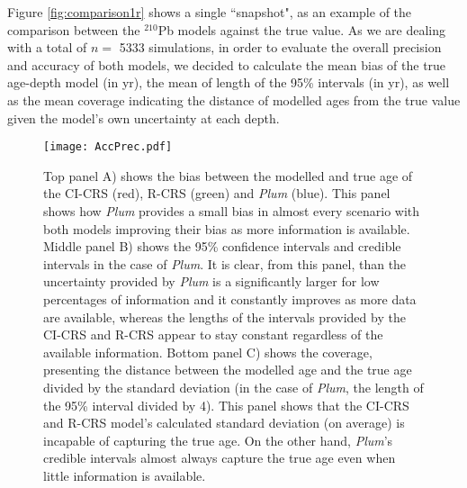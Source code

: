 \documentclass [10pt] {article}
\begin{document}
Figure \ref{fig:comparison1r} shows a single ``snapshot", as an example of the comparison between the $^{210}$Pb models against the true value. 
As we are dealing with a total of $n =$ 5333 simulations, in order to evaluate the overall precision and accuracy of both models, we decided to calculate the mean bias of the true age-depth model (in yr), the mean of length of the 95\% intervals (in yr), as well as the mean coverage indicating the distance of modelled ages from the true value given the model's own uncertainty at each depth.  

\begin{figure}[!]
 \centering
  \texttt{[image: AccPrec.pdf]}
	\caption{Top panel A) shows the bias between the modelled and true age of the CI-CRS (red), R-CRS (green) and \textit{Plum} (blue). This panel shows how \textit{Plum} provides a small bias in almost every scenario with both models improving their bias as more information is available. Middle panel B) shows the 95\% confidence intervals and credible intervals in the case of \textit{Plum}. It is clear, from this panel, than the uncertainty provided by \textit{Plum} is a significantly larger for low percentages of information and it constantly improves as more data are available, whereas the lengths of the intervals provided by the CI-CRS and R-CRS appear to stay constant regardless of the available information. Bottom panel C) shows the coverage, presenting the distance between the modelled age and the true age divided by the standard deviation (in the case of \textit{Plum}, the length of the 95\% interval divided by 4). This panel shows that the CI-CRS and R-CRS model's calculated standard deviation (on average) is incapable of capturing the true age. On the other hand, \textit{Plum}'s credible intervals almost always capture the true age even when little information is available.}
  \label{fig:accpre}
\end{figure}
\end{document}
